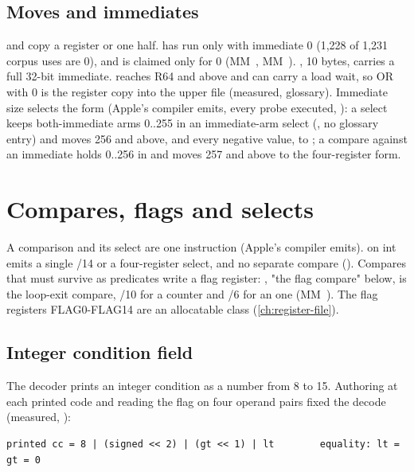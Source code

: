 \subsection*{Moves and immediates}

 and  copy a register or one half.
 has run only with immediate 0 (1,228 of 1,231 corpus uses are 0), and  is claimed only for 0 (MM~, MM~). , 10 bytes, carries a full 32-bit immediate.  reaches
R64 and above and can carry a load wait, so OR with 0 is the register copy into the upper file (measured,
glossary). Immediate size selects the form (Apple's compiler emits, every probe executed, ):
a select keeps both-immediate arms 0..255 in an immediate-arm select (, no glossary entry) and moves 256 and above,
and every negative value, to ; a compare against an immediate holds 0..256
in  and moves 257 and above to the four-register form.

\section{Compares, flags and selects}\label{sec:compares-flags-selects}

A comparison and its select are one instruction (Apple's compiler emits).  on int emits a single /14 or a four-register select, and no separate compare
(). Compares that must survive as predicates write a flag register: , "the flag compare" below, is the loop-exit compare, /10 for a  counter and /6 for an  one (MM~).
The flag registers FLAG0-FLAG14 are an allocatable class (\cref{ch:register-file}).

\subsection*{Integer condition field}\label{sub:integer-condition-field}

The decoder prints an integer condition as a number from 8 to 15. Authoring  at
each printed code and reading the flag on four operand pairs fixed the decode (measured, ):

\begin{lstlisting}
printed cc = 8 | (signed << 2) | (gt << 1) | lt        equality: lt = gt = 0
\end{lstlisting}

